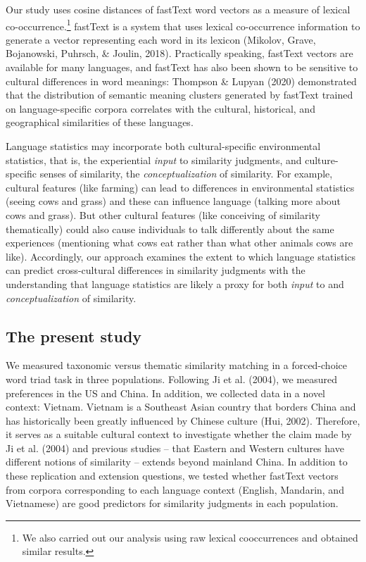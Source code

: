 \documentclass[10pt, letterpaper]{article}
\begin{document}
Our study uses cosine distances of fastText word vectors as a measure of
lexical co-occurrence.\footnote{We also carried out our analysis using
  raw lexical cooccurrences and obtained similar results.} fastText is a
system that uses lexical co-occurrence information to generate a vector
representing each word in its lexicon (Mikolov, Grave, Bojanowski,
Puhrsch, \& Joulin, 2018). Practically speaking, fastText vectors are
available for many languages, and fastText has also been shown to be
sensitive to cultural differences in word meanings: Thompson \& Lupyan
(2020) demonstrated that the distribution of semantic meaning clusters
generated by fastText trained on language-specific corpora correlates
with the cultural, historical, and geographical similarities of these
languages.

Language statistics may incorporate both cultural-specific environmental
statistics, that is, the experiential \emph{input} to similarity
judgments, and culture-specific senses of similarity, the
\emph{conceptualization} of similarity. For example, cultural features
(like farming) can lead to differences in environmental statistics
(seeing cows and grass) and these can influence language (talking more
about cows and grass). But other cultural features (like conceiving of
similarity thematically) could also cause individuals to talk
differently about the same experiences (mentioning what cows eat rather
than what other animals cows are like). Accordingly, our approach
examines the extent to which language statistics can predict
cross-cultural differences in similarity judgments with the
understanding that language statistics are likely a proxy for both
\emph{input} to and \emph{conceptualization} of similarity.

\hypertarget{the-present-study}{%
\subsection{The present study}\label{the-present-study}}

We measured taxonomic versus thematic similarity matching in a
forced-choice word triad task in three populations. Following Ji et al.
(2004), we measured preferences in the US and China. In addition, we
collected data in a novel context: Vietnam. Vietnam is a Southeast Asian
country that borders China and has historically been greatly influenced
by Chinese culture (Hui, 2002). Therefore, it serves as a suitable
cultural context to investigate whether the claim made by Ji et al.
(2004) and previous studies -- that Eastern and Western cultures have
different notions of similarity -- extends beyond mainland China. In
addition to these replication and extension questions, we tested whether
fastText vectors from corpora corresponding to each language context
(English, Mandarin, and Vietnamese) are good predictors for similarity
judgments in each population.
\end{document}
